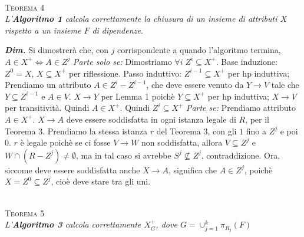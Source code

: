 \documentclass[a4paper,10pt]{article} %
\newcommand{\dimo}[1]{%
    \par \hfill\begin{minipage}{0.99\linewidth}{ \tiny {\textbf{\em{Dim.}}} {#1} }\end{minipage}}
\newcommand{\mtheorem}[1]{%
    {\hspace*{-10pt} \textsc {#1}}}
\begin{document}
    \\[1ex]
    \mtheorem {Teorema 4}\\
        \emph{L'\textbf{Algoritmo 1} calcola correttamente la chiusura di un insieme di attributi $X$ rispetto a un insieme $F$ di dipendenze.}
        \dimo{
            Si dimostrerà che, con $j$ corrispondente a quando l'algoritmo termina, $A \in X^+ \Leftrightarrow A \in Z^j$
            \emph{Parte solo se:} Dimostriamo $\forall i \; Z^i \subseteq X^+$. Base induzione: $Z^0 = X$, $X \subseteq X^+$ per riflessione.
            Passo induttivo: $Z^{i-1} \subseteq X^+$ per hp induttiva; Prendiamo un attributo $A \in Z^i - Z^{i-1}$, che deve essere venuto da $Y \rightarrow V$ tale che $Y \subseteq Z^{i-1}$ e $A \in V$. $X \rightarrow Y$ per Lemma 1 poichè $Y \subseteq X^+$ per hp induttiva; $X \rightarrow V$ per transitività. Quindi $A \in X^+$. Quindi $Z^i \subseteq X^+$
            \emph{Parte se:} Prendiamo attributo $A \in X^+$. $X \rightarrow A$ deve essere soddisfatta in ogni istanza legale di $R$, per il Teorema 3. Prendiamo la stessa istanza $r$ del Teorema 3, con gli $1$ fino a $Z^j$ e poi $0$. $r$ è legale poichè se ci fosse $V \rightarrow W$ non soddisfatta, allora $V \subseteq Z^j$ e $W \cap (R - Z^j) \neq \emptyset$, ma in tal caso si avrebbe $S^j \not \subseteq Z^j$, contraddizione. Ora, siccome deve essere soddisfatta anche $X \rightarrow A$, significa che $A \in Z^j$, poichè $X = Z^0 \subseteq Z^j$, cioè deve stare tra gli uni.
        }
    \\[1ex]
    \mtheorem {Teorema 5}\\
        \emph{L'\textbf{Algoritmo 3} calcola correttamente $X_G^+$, dove $G = \cup_{j=1}^k \pi_{R_j}(F)$}
\end{document}
